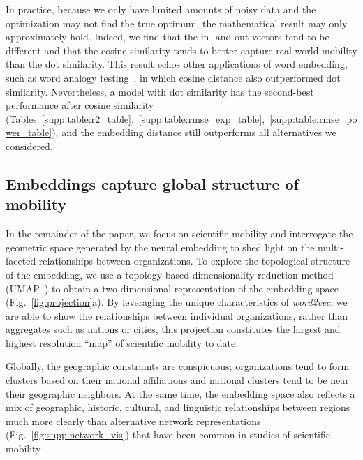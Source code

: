 \documentclass[12pt]{article} %
\begin{document}
In practice, because we only have limited amounts of noisy data and the optimization may not find the true optimum, the mathematical result may only approximately hold.
Indeed, we find that the in- and out-vectors tend to be different and that the cosine similarity tends to better capture real-world mobility than the dot similarity.
This result echos other applications of word embedding, such as word analogy testing~\autocite{levy2015improving}, in which cosine distance also outperformed dot similarity.
Nevertheless, a model with dot similarity has the second-best performance after cosine similarity (Tables~\ref{supp:table:r2_table},~\ref{supp:table:rmse_exp_table},~\ref{supp:table:rmse_power_table}), and the embedding distance still outperforms all alternatives we considered.


\subsection*{Embeddings capture global structure of mobility}

In the remainder of the paper, we focus on scientific mobility and interrogate the geometric space generated by the neural embedding to shed light on the multi-faceted relationships between organizations.
To explore the topological structure of the embedding, we use a topology-based dimensionality reduction method (UMAP~\autocite{mcinnes2018umap}) to obtain a two-dimensional representation of the embedding space (Fig.~\ref{fig:projection}a).
By leveraging the unique characteristics of \textit{word2vec}, we are able to show the relationships between individual organizations, rather than aggregates such as nations or cities, this projection constitutes the largest and highest resolution ``map'' of scientific mobility to date.

Globally, the geographic constraints are conspicuous; organizations tend to form clusters based on their national affiliations and national clusters tend to be near their geographic neighbors.
At the same time, the embedding space also reflects a mix of geographic, historic, cultural, and linguistic relationships between regions much more clearly than alternative network representations (Fig.~\ref{fig:supp:network_vis}) that have been common in studies of scientific mobility~\autocite{chinchilla2018global, czaika2018globalisation}.
\end{document}
